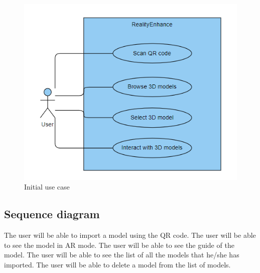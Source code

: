 \begin{figure}[ht]
    \centering
    \includegraphics{img/UseCaseDiagram.png}
    \caption{Initial use case}
    \label{fig:InitialUseCase}
\end{figure}

\clearpage

\subsection*{Sequence diagram}
The user will be able to import a model using the QR code. The user will be able to see the model in AR mode. The user will be able to see the guide of the model. The user will be able to see the list of all the models that he/she has imported. The user will be able to delete a model from the list of models.

